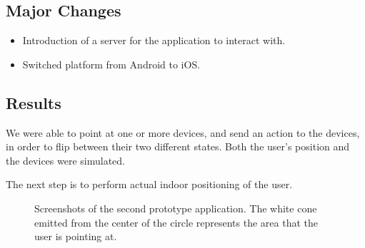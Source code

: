 \subsection{Major Changes}
\begin{itemize}
    \item Introduction of a server for the application to interact with.
    \item Switched platform from Android to iOS.
\end{itemize}

\subsection{Results}

We were able to point at one or more devices,
and send an action to the devices, 
in order to flip between their two different states. 
Both the user's position and the devices were simulated.

The next step is to perform actual indoor positioning of the user.

\begin{figure}[!htb]%
    \centering
    \caption{Screenshots of the second prototype application. The white cone emitted from the center of the circle represents the area that the user is pointing at.}
    \label{fig:prototype2-app-screenshots}
\end{figure}


